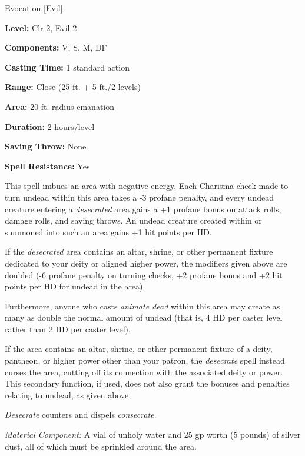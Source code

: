 
Evocation [Evil]

\textbf{Level:} Clr 2, Evil 2

\textbf{Components:} V, S, M, DF

\textbf{Casting Time:} 1 standard action

\textbf{Range:} Close (25 ft. + 5 ft./2 levels)

\textbf{Area:} 20-ft.-radius emanation

\textbf{Duration:} 2 hours/level

\textbf{Saving Throw:} None

\textbf{Spell Resistance:} Yes

This spell imbues an area with negative energy. Each Charisma check made to turn 
undead within this area takes a -3 profane penalty, and every undead creature entering 
a \textit{desecrated} area gains a +1 profane bonus on attack rolls, damage rolls, 
and saving throws. An undead creature created within or summoned into such an area 
gains +1 hit points per HD.

If the \textit{desecrated} area contains an altar, shrine, or other permanent fixture 
dedicated to your deity or aligned higher power, the modifiers given above are 
doubled (-6 profane penalty on turning checks, +2 profane bonus and +2 hit points 
per HD for undead in the area).

Furthermore, anyone who casts \textit{animate dead} within this area may create 
as many as double the normal amount of undead (that is, 4 HD per caster level rather 
than 2 HD per caster level).

If the area contains an altar, shrine, or other permanent fixture of a deity, pantheon, 
or higher power other than your patron, the \textit{desecrate} spell instead curses 
the area, cutting off its connection with the associated deity or power. This secondary 
function, if used, does not also grant the bonuses and penalties relating to undead, 
as given above.

\textit{Desecrate} counters and dispels \textit{consecrate}.

\textit{Material Component:} A vial of unholy water and 25 gp worth (5 pounds) 
of silver dust, all of which must be sprinkled around the area.

